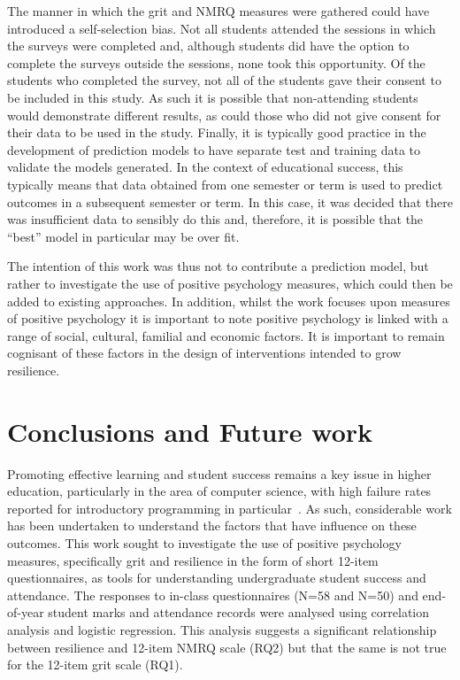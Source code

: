\documentclass[sigconf]{acmart}
\begin{document}
The manner in which the grit and NMRQ measures were gathered could have introduced a self-selection bias. Not all students attended the sessions in which the surveys were completed and, although students did have the option to complete the surveys outside the sessions, none took this opportunity. Of the students who completed the survey, not all of the students gave their consent to be included in this study. As such it is possible that non-attending students would demonstrate different results, as could those who did not give consent for their data to be used in the study. Finally, it is typically good practice in the development of prediction models to have separate test and training data to validate the models generated. In the context of educational success, this typically means that data obtained from one semester or term is used to predict outcomes in a subsequent semester or term. In this case, it was decided that there was insufficient data to sensibly do this and, therefore, it is possible that the ``best'' model in particular may be over fit. 

The intention of this work was thus not to contribute a prediction model, but rather to investigate the use of positive psychology measures, which could then be added to existing approaches. In addition, whilst the work focuses upon measures of positive psychology it is important to note positive psychology is linked with a range of social, cultural, familial and economic factors. It is important to remain cognisant of these factors in the design of interventions intended to grow resilience.

\section{Conclusions and Future work}
Promoting effective learning and student success remains a key issue in higher education, particularly in the area of computer science, with high failure rates reported for introductory programming in particular~\cite{Watson:2014:FRI:2591708.2591749,Bennedsen2019}. As such, considerable work has been undertaken to understand the factors that have influence on these outcomes. This work sought to investigate the use of positive psychology measures, specifically grit and resilience in the form of short 12-item questionnaires, as tools for understanding undergraduate student success and attendance. The responses to in-class questionnaires (N=58 and N=50) and end-of-year student marks and attendance records were analysed using correlation analysis and logistic regression. This analysis suggests a significant relationship between resilience and 12-item NMRQ scale (RQ2) but that the same is not true for the 12-item grit scale (RQ1).
\end{document}
